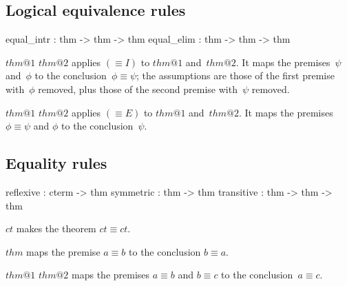 \subsection{Logical equivalence rules}
\begin{ttbox} 
equal_intr : thm -> thm -> thm 
equal_elim : thm -> thm -> thm
\end{ttbox}
\begin{ttdescription}
\item[\ttindexbold{equal_intr} $thm@1$ $thm@2$] 
applies $({\equiv}I)$ to $thm@1$ and~$thm@2$.  It maps the premises~$\psi$
and~$\phi$ to the conclusion~$\phi\equiv\psi$; the assumptions are those of
the first premise with~$\phi$ removed, plus those of
the second premise with~$\psi$ removed.

\item[\ttindexbold{equal_elim} $thm@1$ $thm@2$] 
applies $({\equiv}E)$ to $thm@1$ and~$thm@2$.  It maps the premises
$\phi\equiv\psi$ and $\phi$ to the conclusion~$\psi$.
\end{ttdescription}


\subsection{Equality rules}
\begin{ttbox} 
reflexive  : cterm -> thm
symmetric  : thm -> thm
transitive : thm -> thm -> thm
\end{ttbox}
\begin{ttdescription}
\item[\ttindexbold{reflexive} $ct$] 
makes the theorem \(ct\equiv ct\). 

\item[\ttindexbold{symmetric} $thm$] 
maps the premise $a\equiv b$ to the conclusion $b\equiv a$.

\item[\ttindexbold{transitive} $thm@1$ $thm@2$] 
maps the premises $a\equiv b$ and $b\equiv c$ to the conclusion~${a\equiv c}$.
\end{ttdescription}


